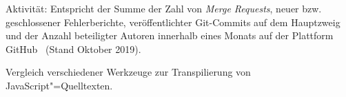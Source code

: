 \begin{table}[tb]
{    \begin{justify}
      Aktivität: Entspricht der Summe der Zahl von \emph{Merge Requests}, neuer bzw. geschlossener Fehlerberichte, veröffentlichter Git-Commits auf dem Hauptzweig und der Anzahl beteiligter Autoren innerhalb eines Monats auf der Plattform GitHub~\autocite{GITHUB} (Stand Oktober 2019).
    \end{justify}
  }
  \vspace{-0.25\baselineskip}
  \caption{Vergleich verschiedener Werkzeuge zur Transpilierung von JavaScript"=Quelltexten.}
  \label{tab:transpilers}
\end{table}
\endgroup
